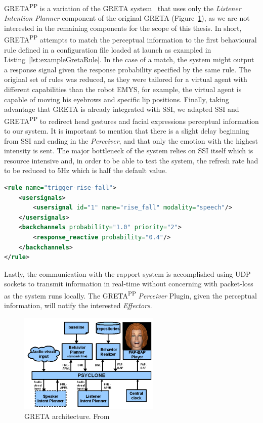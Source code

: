 GRETA\textsuperscript{PP} is a variation of the GRETA system~\cite{Niewiadomski2009} that uses only the  \textit{Listener Intention Planner} component of the original GRETA (Figure~\ref{fig:GretaOriginal}), as we are not interested in the remaining components for the scope of this thesis. In short, GRETA\textsuperscript{PP} attempts to match the perceptual information to the first behavioural rule defined in a configuration file loaded at launch as exampled in Listing~\ref{lst:exampleGretaRule}. In the case of a match, the system might output a response signal given the response probability specified by the same rule. The original set of rules was reduced, as they were tailored for a virtual agent with different capabilities than the robot \ac{EMYS}, for example, the virtual agent is capable of moving his eyebrows and specific lip positions. Finally, taking advantage that GRETA is already integrated with \ac{SSI}, we adapted \ac{SSI} and GRETA\textsuperscript{PP} to redirect head gestures and facial expressions perceptual information to our system. It is important to mention that there is a slight delay beginning from \ac{SSI} and ending in the \textit{Perceiver}, and that only the emotion with the highest intensity is sent. The major bottleneck of the system relies on \ac{SSI} itself which is resource intensive and, in order to be able to test the system, the refresh rate had to be reduced to 5Hz which is half the default value.


\begin{lstlisting}[caption={One of the backchannels rules used GRETA and GRETA\textsuperscript{PP}.},label={lst:exampleGretaRule},language=XML]
<rule name="trigger-rise-fall">
	<usersignals>
		<usersignal id="1" name="rise_fall" modality="speech"/>
	</usersignals>
	<backchannels probability="1.0" priority="2">
		<response_reactive probability="0.4"/>
	</backchannels>
</rule>
\end{lstlisting}

Lastly, the communication with the rapport system is accomplished using \ac{UDP} sockets to transmit information in real-time without concerning with packet-loss as the system runs locally. The GRETA\textsuperscript{PP} \textit{Perceiver} Plugin, given the perceptual information, will notify the interested \textit{Effectors}.

\begin{figure}[H]
	\centering
	\includegraphics[width=0.6\textwidth]{images/GretaArchitecture.png}
	\caption{GRETA architecture. From~\cite{Niewiadomski2009}}
	\label{fig:GretaOriginal}
\end{figure}



